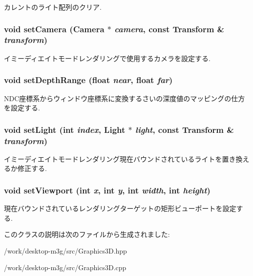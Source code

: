 カレントのライト配列のクリア. \hypertarget{classm3g_1_1Graphics3D_0df7bb61cfeba6626e20fd07ddd1c460}{
\subsubsection[{setCamera}]{\setlength{\rightskip}{0pt plus 5cm}void setCamera ({\bf Camera} $\ast$ {\em camera}, \/  const {\bf Transform} \& {\em transform})}}
\label{classm3g_1_1Graphics3D_0df7bb61cfeba6626e20fd07ddd1c460}


イミーディエイトモードレンダリングで使用するカメラを設定する. \hypertarget{classm3g_1_1Graphics3D_6fc3837286f3516aa3320aeec9729495}{
\subsubsection[{setDepthRange}]{\setlength{\rightskip}{0pt plus 5cm}void setDepthRange (float {\em near}, \/  float {\em far})}}
\label{classm3g_1_1Graphics3D_6fc3837286f3516aa3320aeec9729495}


NDC座標系からウィンドウ座標系に変換するさいの深度値のマッピングの仕方を設定する. \hypertarget{classm3g_1_1Graphics3D_2bf83cb69f50117dd9d5548fe96d0ab0}{
\subsubsection[{setLight}]{\setlength{\rightskip}{0pt plus 5cm}void setLight (int {\em index}, \/  {\bf Light} $\ast$ {\em light}, \/  const {\bf Transform} \& {\em transform})}}
\label{classm3g_1_1Graphics3D_2bf83cb69f50117dd9d5548fe96d0ab0}


イミーディエイトモードレンダリング現在バウンドされているライトを置き換えるか修正する. \hypertarget{classm3g_1_1Graphics3D_0b4ec48e9c19060e9be5648c118c23b1}{
\subsubsection[{setViewport}]{\setlength{\rightskip}{0pt plus 5cm}void setViewport (int {\em x}, \/  int {\em y}, \/  int {\em width}, \/  int {\em height})}}
\label{classm3g_1_1Graphics3D_0b4ec48e9c19060e9be5648c118c23b1}


現在バウンドされているレンダリングターゲットの矩形ビューポートを設定する. 

このクラスの説明は次のファイルから生成されました:\begin{CompactItemize}
\item 
/work/desktop-m3g/src/Graphics3D.hpp\item 
/work/desktop-m3g/src/Graphics3D.cpp\end{CompactItemize}
